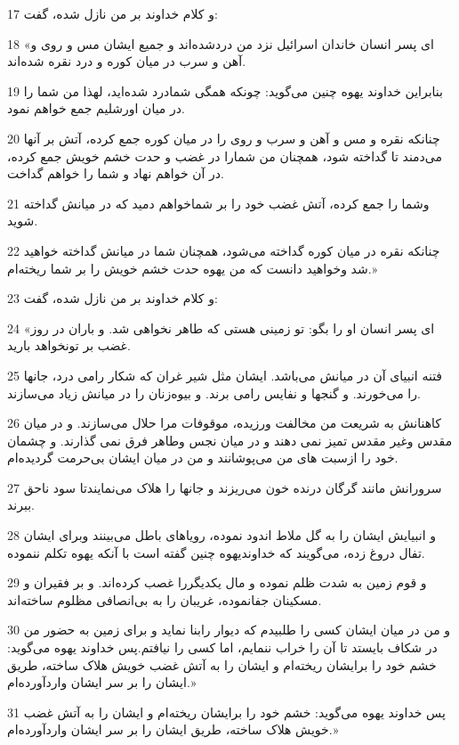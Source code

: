 \par 17 و کلام خداوند بر من نازل شده، گفت:
\par 18 «ای پسر انسان خاندان اسرائیل نزد من دردشده‌اند و جمیع ایشان مس و روی و آهن و سرب در میان کوره و درد نقره شده‌اند.
\par 19 بنابراین خداوند یهوه چنین می‌گوید: چونکه همگی شمادرد شده‌اید، لهذا من شما را در میان اورشلیم جمع خواهم نمود.
\par 20 چنانکه نقره و مس و آهن و سرب و روی را در میان کوره جمع کرده، آتش بر آنها می‌دمند تا گداخته شود، همچنان من شمارا در غضب و حدت خشم خویش جمع کرده، در آن خواهم نهاد و شما را خواهم گداخت.
\par 21 وشما را جمع کرده، آتش غضب خود را بر شماخواهم دمید که در میانش گداخته شوید.
\par 22 چنانکه نقره در میان کوره گداخته می‌شود، همچنان شما در میانش گداخته خواهید شد وخواهید دانست که من یهوه حدت خشم خویش را بر شما ریخته‌ام.»
\par 23 و کلام خداوند بر من نازل شده، گفت:
\par 24 «ای پسر انسان او را بگو: تو زمینی هستی که طاهر نخواهی شد. و باران در روز غضب بر تونخواهد بارید.
\par 25 فتنه انبیای آن در میانش می‌باشد. ایشان مثل شیر غران که شکار رامی درد، جانها را می‌خورند. و گنجها و نفایس رامی برند. و بیوه‌زنان را در میانش زیاد می‌سازند.
\par 26 کاهنانش به شریعت من مخالفت ورزیده، موقوفات مرا حلال می‌سازند. و در میان مقدس وغیر مقدس تمیز نمی دهند و در میان نجس وطاهر فرق نمی گذارند. و چشمان خود را ازسبت های من می‌پوشانند و من در میان ایشان بی‌حرمت گردیده‌ام.
\par 27 سرورانش مانند گرگان درنده خون می‌ریزند و جانها را هلاک می‌نمایندتا سود ناحق ببرند.
\par 28 و انبیایش ایشان را به گل ملاط اندود نموده، رویاهای باطل می‌بینند وبرای ایشان تفال دروغ زده، می‌گویند که خداوندیهوه چنین گفته است با آنکه یهوه تکلم ننموده.
\par 29 و قوم زمین به شدت ظلم نموده و مال یکدیگررا غصب کرده‌اند. و بر فقیران و مسکینان جفانموده، غریبان را به بی‌انصافی مظلوم ساخته‌اند.
\par 30 و من در میان ایشان کسی را طلبیدم که دیوار رابنا نماید و برای زمین به حضور من در شکاف بایستد تا آن را خراب ننمایم، اما کسی را نیافتم.پس خداوند یهوه می‌گوید: خشم خود را برایشان ریخته‌ام و ایشان را به آتش غضب خویش هلاک ساخته، طریق ایشان را بر سر ایشان واردآورده‌ام.»
\par 31 پس خداوند یهوه می‌گوید: خشم خود را برایشان ریخته‌ام و ایشان را به آتش غضب خویش هلاک ساخته، طریق ایشان را بر سر ایشان واردآورده‌ام.»

